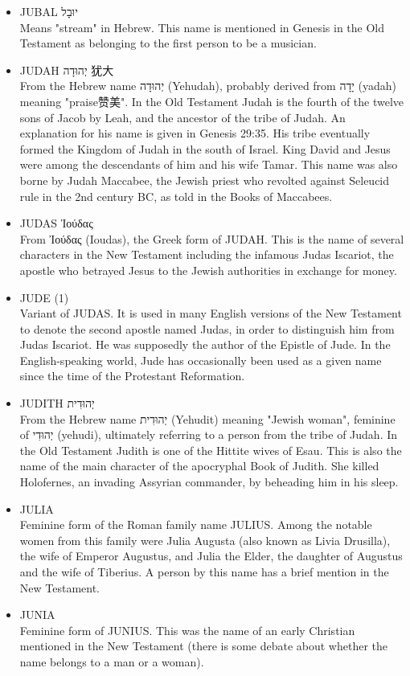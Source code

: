 \begin{itemize}
Means "YAHWEH is perfect耶和华是正直的" in Hebrew. In the Old Testament this is the name of both a son of Gideon and a king of Judah.
\item JUBAL יוּבָל \\
Means "stream" in Hebrew. This name is mentioned in Genesis in the Old Testament as belonging to the first person to be a musician.
\item JUDAH יְהוּדָה 犹大\\
From the Hebrew name יְהוּדָה (Yehudah), probably derived from יָדָה (yadah) meaning "praise赞美". In the Old Testament Judah is the fourth of the twelve sons of Jacob by Leah, and the ancestor of the tribe of Judah. An explanation for his name is given in Genesis 29:35. His tribe eventually formed the Kingdom of Judah in the south of Israel. King David and Jesus were among the descendants of him and his wife Tamar. This name was also borne by Judah Maccabee, the Jewish priest who revolted against Seleucid rule in the 2nd century BC, as told in the Books of Maccabees.
\item JUDAS Ἰούδας \\
From Ἰούδας (Ioudas), the Greek form of JUDAH. This is the name of several characters in the New Testament including the infamous Judas Iscariot, the apostle who betrayed Jesus to the Jewish authorities in exchange for money.
\item JUDE (1) \\
Variant of JUDAS. It is used in many English versions of the New Testament to denote the second apostle named Judas, in order to distinguish him from Judas Iscariot. He was supposedly the author of the Epistle of Jude. In the English-speaking world, Jude has occasionally been used as a given name since the time of the Protestant Reformation.
\item JUDITH יְהוּדִית \\
From the Hebrew name יְהוּדִית (Yehudit) meaning "Jewish woman", feminine of יְהוּדִי (yehudi), ultimately referring to a person from the tribe of Judah. In the Old Testament Judith is one of the Hittite wives of Esau. This is also the name of the main character of the apocryphal Book of Judith. She killed Holofernes, an invading Assyrian commander, by beheading him in his sleep.
\item JULIA \\
Feminine form of the Roman family name JULIUS. Among the notable women from this family were Julia Augusta (also known as Livia Drusilla), the wife of Emperor Augustus, and Julia the Elder, the daughter of Augustus and the wife of Tiberius. A person by this name has a brief mention in the New Testament. 

\item JUNIA \\
Feminine form of JUNIUS. This was the name of an early Christian mentioned in the New Testament (there is some debate about whether the name belongs to a man or a woman).
\end{itemize}

